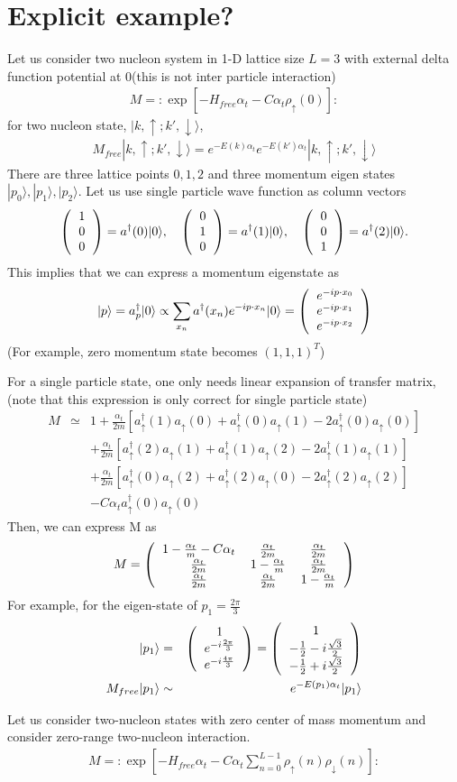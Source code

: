 \documentclass[10pt]{book}
\newcommand{\bea}{\begin{eqnarray}}
\newcommand{\eea}{\end{eqnarray}}
\newcommand{\no}{\nonumber \\}
\def\ra{\rangle}
\newcommand{\colmthr}[3]
{\left(\begin{tabular}{c} {$#1$}\\{$#2$}\\{$#3$}\end{tabular}\right)}
\newcommand{\threedmat}[9]
{\left(\begin{tabular}{ccc} {$#1$}&{$#2$}&{$#3$} \\
		{$#4$}&{$#5$}&{$#6$}\\
		{$#7$}&{$#8$}&{$#9$}\\
	\end{tabular}\right)}
\begin{document}
\chapter{Explicit example?}
Let us consider two nucleon system in 1-D lattice size $L=3$
with external delta function potential at 0(this is not inter particle interaction)
\bea 
M=:\exp\left[-H_{free}\alpha_t-C\alpha_t \rho_\uparrow(0)\right]:
\eea 
for two nucleon state, $|k,\uparrow; k',\downarrow\ra $,
\bea 
M_{free}|k,\uparrow; k',\downarrow\ra =e^{-E(k)\alpha_t}e^{-E(k')\alpha_t}|k,\uparrow; k',\downarrow\ra
\eea 
There are three lattice points $0,1,2$ and three momentum eigen states $|p_0\ra,|p_1\ra,|p_2\ra$.  
Let us use single particle  wave function as column vectors
\bea 
 \colmthr{1}{0}{0}= a^\dagger(0)|0\ra,\quad 
 \colmthr{0}{1}{0}= a^\dagger(1)|0\ra,\quad  
 \colmthr{0}{0}{1}= a^\dagger(2)|0\ra. 
\eea 
This implies that we can express a momentum eigenstate as
\bea 
|p\ra = a^\dagger_p|0\ra \propto \sum_{x_n} a^\dagger(x_n) e^{-ip\cdot x_n}|0\ra 
      =\colmthr{e^{-ip\cdot x_0}}{e^{-ip\cdot x_1}}{e^{-ip\cdot x_2}}
\eea 
(For example, zero momentum state becomes $(1, 1 , 1)^T$)

For a single particle state, one only needs linear expansion of transfer matrix,
(note that this expression is only correct for single particle state)
\bea 
M&\simeq &1+\frac{\alpha_t}{2m}[a^\dagger_\uparrow(1) a_\uparrow(0)
                             +a^\dagger_\uparrow(0) a_\uparrow(1)
                             -2 a^\dagger_\uparrow(0) a_\uparrow(0) ]  \no 
     & & + \frac{\alpha_t}{2m}[a^\dagger_\uparrow(2) a_\uparrow(1)
     +a^\dagger_\uparrow(1) a_\uparrow(2)
     -2 a^\dagger_\uparrow(1) a_\uparrow(1) ] \no 
    & &+ \frac{\alpha_t}{2m}[a^\dagger_\uparrow(0) a_\uparrow(2)
    +a^\dagger_\uparrow(2) a_\uparrow(0)
    -2 a^\dagger_\uparrow(2) a_\uparrow(2) ]   \no                     
    & & -C\alpha_t a^\dagger_\uparrow(0) a_\uparrow(0) 
\eea 
Then, we can express M as 
\bea 
M=\threedmat{1-\frac{\alpha_t}{m}-C\alpha_t}{\frac{\alpha_t}{2m}}{\frac{\alpha_t}{2m}}
            {\frac{\alpha_t}{2m}}{1-\frac{\alpha_t}{m}}{\frac{\alpha_t}{2m}}
            {\frac{\alpha_t}{2m}}{\frac{\alpha_t}{2m}}{1-\frac{\alpha_t}{m}}
\eea 
For example, for the eigen-state of $p_1=\frac{2\pi}{3}$
\bea 
|p_1\ra&=& \colmthr{1}{e^{-i\frac{2\pi}{3}}}{e^{-i\frac{4\pi}{3}}}
       = \colmthr{1}{-\frac{1}{2}-i\frac{\sqrt{3}}{2}} {-\frac{1}{2}+i\frac{\sqrt{3}}{2}}\no 
M_{free}|p_1\ra &\sim & e^{-E(p_1)\alpha_t }|p_1\ra         
\eea  

Let us consider two-nucleon states with zero center of mass momentum
and consider zero-range two-nucleon interaction.
\bea 
M=:\exp\left[ -H_{free}\alpha_t -C\alpha_t \sum_{n=0}^{L-1}\rho_\uparrow(n)\rho_\downarrow(n)\right]: 
\eea 
\end{document}
